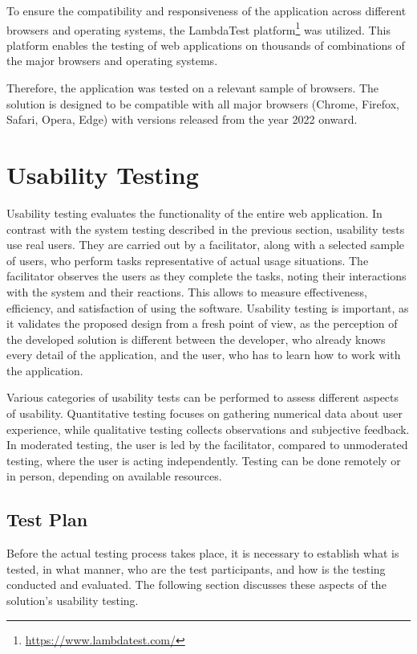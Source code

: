 To ensure the compatibility and responsiveness of the application across different browsers and operating systems, the LambdaTest platform\footnote{\url{https://www.lambdatest.com/}} was utilized. This platform enables the testing of web applications on thousands of combinations of the major browsers and operating systems. \cite{LambdaTest}

Therefore, the application was tested on a relevant sample of browsers. The solution is designed to be compatible with all major browsers (Chrome, Firefox, Safari, Opera, Edge) with versions released from the year 2022 onward.


\section{Usability Testing}

Usability testing evaluates the functionality of the entire web application. In contrast with the system testing described in the previous section, usability tests use real users. They are carried out by a facilitator, along with a selected sample of users, who perform tasks representative of actual usage situations. The facilitator observes the users as they complete the tasks, noting their interactions with the system and their reactions. This allows to measure effectiveness, efficiency, and satisfaction of using the software. Usability testing is important, as it validates the proposed design from a fresh point of view, as the perception of the developed solution is different between the developer, who already knows every detail of the application, and the user, who has to learn how to work with the application.~\cite{Barnum2021}

Various categories of usability tests can be performed to assess different aspects of usability. Quantitative testing focuses on gathering numerical data about user experience, while qualitative testing collects observations and subjective feedback. In moderated testing, the user is led by the facilitator, compared to unmoderated testing, where the user is acting independently. Testing can be done remotely or in person, depending on available resources. \cite{Moran2019}

\subsection{Test Plan}

Before the actual testing process takes place, it is necessary to establish what is tested, in what manner, who are the test participants, and how is the testing conducted and evaluated. The following section discusses these aspects of the solution's usability testing.

